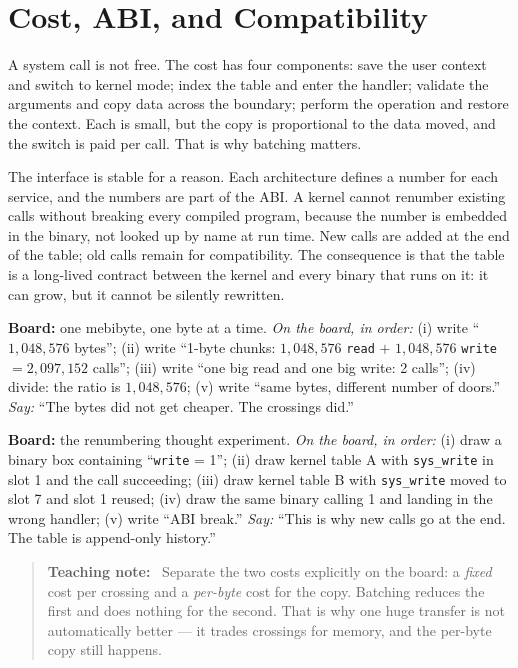 \documentclass[11pt]{article}
\newenvironment{teachingaside}{\begin{quote}\small\color{primary-gold}\textbf{Teaching note:}\ }{\end{quote}}
\begin{document}
\section{Cost, ABI, and Compatibility}

A system call is not free. The cost has four components: save the user context and switch to kernel mode; index the table and enter the handler; validate the arguments and copy data across the boundary; perform the operation and restore the context. Each is small, but the copy is proportional to the data moved, and the switch is paid per call. That is why batching matters.

The interface is stable for a reason. Each architecture defines a number for each service, and the numbers are part of the ABI. A kernel cannot renumber existing calls without breaking every compiled program, because the number is embedded in the binary, not looked up by name at run time. New calls are added at the end of the table; old calls remain for compatibility. The consequence is that the table is a long-lived contract between the kernel and every binary that runs on it: it can grow, but it cannot be silently rewritten.

\textbf{Board:} one mebibyte, one byte at a time. \emph{On the board, in order:} (i) write ``$1{,}048{,}576$ bytes''; (ii) write ``1-byte chunks: $1{,}048{,}576$ \texttt{read} $+$ $1{,}048{,}576$ \texttt{write} $= 2{,}097{,}152$ calls''; (iii) write ``one big read and one big write: 2 calls''; (iv) divide: the ratio is $1{,}048{,}576$; (v) write ``same bytes, different number of doors.'' \emph{Say:} ``The bytes did not get cheaper. The crossings did.''

\textbf{Board:} the renumbering thought experiment. \emph{On the board, in order:} (i) draw a binary box containing ``\texttt{write} = 1''; (ii) draw kernel table A with \texttt{sys\_write} in slot 1 and the call succeeding; (iii) draw kernel table B with \texttt{sys\_write} moved to slot 7 and slot 1 reused; (iv) draw the same binary calling 1 and landing in the wrong handler; (v) write ``ABI break.'' \emph{Say:} ``This is why new calls go at the end. The table is append-only history.''

\begin{teachingaside}
Separate the two costs explicitly on the board: a \emph{fixed} cost per crossing and a \emph{per-byte} cost for the copy. Batching reduces the first and does nothing for the second. That is why one huge transfer is not automatically better --- it trades crossings for memory, and the per-byte copy still happens.
\end{teachingaside}
\end{document}

